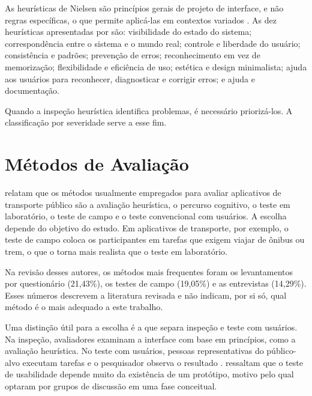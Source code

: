 As heurísticas de Nielsen são princípios gerais de projeto de interface, e não regras específicas, o que permite aplicá-las em contextos variados \cite{suzianti2020}. As dez heurísticas apresentadas por  são: visibilidade do estado do sistema; correspondência entre o sistema e o mundo real; controle e liberdade do usuário; consistência e padrões; prevenção de erros; reconhecimento em vez de memorização; flexibilidade e eficiência de uso; estética e design minimalista; ajuda aos usuários para reconhecer, diagnosticar e corrigir erros; e ajuda e documentação. 

Quando a inspeção heurística identifica problemas, é necessário priorizá-los. A classificação por severidade serve a esse fim. 

\section{Métodos de Avaliação}

 relatam que os métodos usualmente empregados para avaliar aplicativos de transporte público são a avaliação heurística, o percurso cognitivo, o teste em laboratório, o teste de campo e o teste convencional com usuários. A escolha depende do objetivo do estudo. Em aplicativos de transporte, por exemplo, o teste de campo coloca os participantes em tarefas que exigem viajar de ônibus ou trem, o que o torna mais realista que o teste em laboratório.

Na revisão desses autores, os métodos mais frequentes foram os levantamentos por questionário (21,43\%), os testes de campo (19,05\%) e as entrevistas (14,29\%). Esses números descrevem a literatura revisada e não indicam, por si só, qual método é o mais adequado a este trabalho.

Uma distinção útil para a escolha é a que separa inspeção e teste com usuários. Na inspeção, avaliadores examinam a interface com base em princípios, como a avaliação heurística. No teste com usuários, pessoas representativas do público-alvo executam tarefas e o pesquisador observa o resultado \cite{suzianti2020}.  ressaltam que o teste de usabilidade depende muito da existência de um protótipo, motivo pelo qual optaram por grupos de discussão em uma fase conceitual. 

